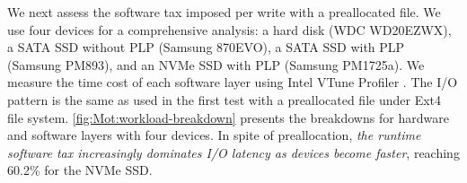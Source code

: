 \iftrue
\vspace{1ex}
\noindent{}
\vspace{0.5ex}
\else
\ul{$\vmathbb{O2}$. \em
The runtime software tax is dominated by file system operations  and badly
impairs the performance of  logging.
}
\fi

We next assess the  software tax imposed per   write with a preallocated file.
We use four   devices for a comprehensive analysis:
%
a   hard disk (WDC WD20EZWX), a SATA SSD without PLP (Samsung 870EVO), a SATA SSD with PLP (Samsung PM893), and an  NVMe SSD with PLP (Samsung PM1725a). 
We measure  the time cost of each software layer   using Intel VTune Profiler \cite{GetStart56:online}. 
The I/O pattern is the same   as used in the first test with a preallocated file under Ext4 file system.
\autoref{fig:Mot:workload-breakdown} presents the breakdowns for hardware and software layers with four devices.
In spite of  preallocation, {\em the runtime
	software tax increasingly dominates   I/O latency
	as   devices become faster}, reaching  60.2\% for the   NVMe SSD. 


